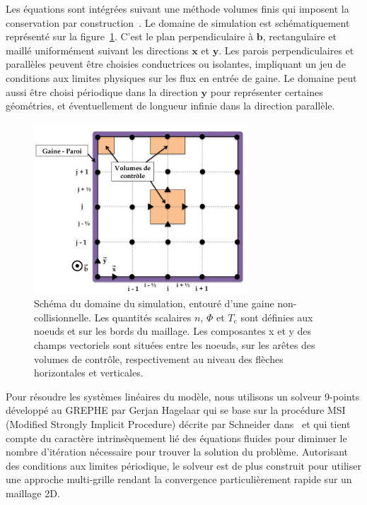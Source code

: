 \begin{refsection}
Les équations sont intégrées suivant une méthode
volumes finis qui imposent la conservation par construction~\parencite{toro}. Le
domaine de simulation est schématiquement représenté sur la figure~\ref{3-maillage}.
C'est le plan perpendiculaire à $\mathbf{b}$, rectangulaire et maillé uniformément suivant
les directions $\mathbf{x}$ et $\mathbf{y}$. Les parois perpendiculaires
et parallèles peuvent être choisies conductrices ou isolantes, impliquant un jeu
de conditions aux limites physiques sur les flux en entrée de gaine. Le domaine
peut aussi être choisi périodique dans la direction $\mathbf y$ pour représenter
certaines géométries, et éventuellement de longueur infinie dans la direction
parallèle.
 
\begin{figure}[htbp]
\centering
\includegraphics[height=64mm,width=80mm]{figures/3-magnisGrid.png}
{\caption{Schéma du domaine du simulation, entouré d'une gaine
non-collisionnelle.
Les quantités scalaires $n$, $\Phi$ et $T_e$ sont définies aux noeuds et sur les
bords du maillage. Les composantes x et y des champs vectoriels sont
situées entre les noeuds, sur les arêtes des volumes de contrôle, respectivement
au niveau des flèches horizontales et verticales.}
\label{3-maillage}}
\end{figure}

Pour résoudre les systèmes linéaires du modèle, nous utilisons un solveur
9-points développé au GREPHE par Gerjan Hagelaar qui se base sur la procédure
MSI (Modified Strongly Implicit Procedure) décrite par Schneider
dans~\parencite{Schneider} et qui tient compte du caractère intrinsèquement lié
des équations fluides pour diminuer le nombre d'itération nécessaire pour
trouver la solution du problème. Autorisant des conditions aux limites
périodique, le solveur est de plus construit pour utiliser une approche multi-grille
rendant la convergence particulièrement rapide sur un maillage 2D.


\end{refsection}
